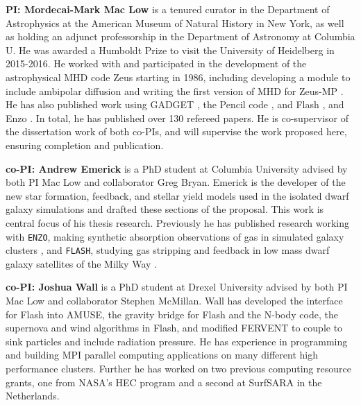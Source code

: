 \documentclass[11pt]{article}
\begin{document}
\textbf{PI: Mordecai-Mark Mac Low}  is a tenured curator in the Department of Astrophysics at the American
Museum of Natural History in New York, as well as holding an adjunct professorship in the Department of 
Astronomy at Columbia U.  He was awarded a Humboldt Prize to visit the University of Heidelberg in 2015-2016.
He worked with and participated in the
development of the astrophysical MHD code Zeus starting in 1986, including
developing a module to include ambipolar diffusion
\citep{MacLow1995,MacLowSmith1997} and writing the first version of MHD
for Zeus-MP 
\citep{Hayes2006}.  He has also published work using GADGET 
\citep{Li2005,Li2005a,Li2006},
the Pencil code 
\citep{Oishi2007,Johansen2007,Johansen2009,Yang2009,OishiMacLow2009,McNally2014}, and
Flash 
\citep{Joung2006,Joung2009,Peters2010,Peters2010a,Peters2010b,Peters2011,Peters2012,Hill2012,Gatto2015,Girichidis2016SImulatingOutflows,Ibanez-Mejia2016}, and Enzo \citep{Simpson2013}.
In
total, he has published over 130 refereed papers. He is co-supervisor of the dissertation work of both co-PIs, and
will supervise the work proposed here, ensuring completion and publication.

\textbf{co-PI: Andrew Emerick} is a PhD student at Columbia University advised by both PI Mac Low and collaborator Greg Bryan. Emerick is the developer of the new star formation, feedback, and stellar yield models used in the isolated dwarf galaxy simulations and drafted these sections of the proposal. This work is central focus of his thesis research. Previously he has published research working with \texttt{ENZO}, making synthetic absorption observations of gas in simulated galaxy clusters \citep{Emerick2015}, and \texttt{FLASH}, studying gas stripping and feedback in low mass dwarf galaxy satellites of the Milky Way \citep{Emerick2016}.

\textbf{co-PI: Joshua Wall} is a PhD student at Drexel University advised by both PI Mac Low and collaborator Stephen McMillan. Wall has developed the interface for Flash into AMUSE, the gravity bridge for Flash and the N-body code, the supernova and wind algorithms in Flash, and modified FERVENT to couple to sink particles and include radiation pressure. He has experience in programming and building MPI parallel computing applications on many different high performance clusters. Further he has worked on two previous computing resource grants, one from NASA's HEC program and a second at SurfSARA in the Netherlands. %
\end{document}
